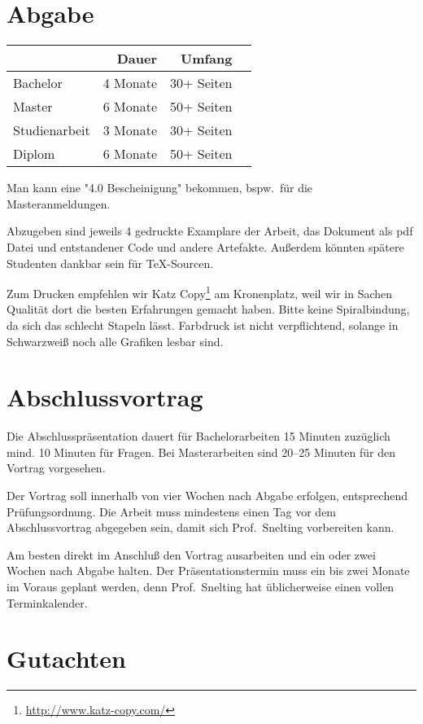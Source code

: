 \section{Abgabe}

\begin{center}
\begin{tabular}{lrrr}
\toprule
 & Dauer & Umfang \\
\midrule
Bachelor      & 4 Monate & 30+ Seiten \\
Master        & 6 Monate & 50+ Seiten \\
Studienarbeit & 3 Monate & 30+ Seiten \\
Diplom        & 6 Monate & 50+ Seiten \\
\bottomrule
\end{tabular}
\end{center}

Man kann eine "4.0 Bescheinigung" bekommen,
bspw.\ für die Masteranmeldungen.

Abzugeben sind jeweils 4 gedruckte Examplare der Arbeit,
das Dokument als pdf Datei
und entstandener Code und andere Artefakte.
Außerdem könnten spätere Studenten dankbar sein für \TeX-Sourcen.

Zum Drucken empfehlen wir
Katz Copy\footnote{\url{http://www.katz-copy.com/}} am Kronenplatz,
weil wir in Sachen Qualität dort die besten Erfahrungen gemacht haben.
Bitte keine Spiralbindung,
da sich das schlecht Stapeln lässt.
Farbdruck ist nicht verpflichtend,
solange in Schwarzweiß noch alle Grafiken lesbar sind.

\section{Abschlussvortrag}

Die Abschlusspräsentation dauert für Bachelorarbeiten 15 Minuten
zuzüglich mind. 10 Minuten für Fragen.
Bei Masterarbeiten sind 20--25 Minuten für den Vortrag vorgesehen.

Der Vortrag soll innerhalb von vier Wochen nach Abgabe erfolgen,
entsprechend Prüfungsordnung.
Die Arbeit muss mindestens einen Tag vor dem Abschlussvortrag abgegeben sein,
damit sich Prof.~Snelting vorbereiten kann.

Am besten direkt im Anschluß den Vortrag ausarbeiten und ein oder zwei Wochen nach Abgabe halten.
Der Präsentationstermin muss ein bis zwei Monate im Voraus geplant werden,
denn Prof.~Snelting hat üblicherweise einen vollen Terminkalender.

\section{Gutachten}

